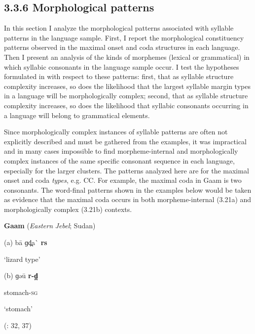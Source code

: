\subsection{3.3.6 Morphological patterns}

  In this section I analyze the morphological patterns associated with syllable patterns in the language sample. First, I report the morphological constituency patterns observed in the maximal onset and coda structures in each language. Then I present an analysis of the kinds of morphemes (lexical or grammatical) in which syllabic consonants in the language sample occur. I test the hypotheses formulated in  with respect to these patterns: first, that as syllable structure complexity increases, so does the likelihood that the largest syllable margin types in a language will be morphologically complex; second, that as syllable structure complexity increases, so does the likelihood that syllabic consonants occurring in a language will belong to grammatical elements.



  Since morphologically complex instances of syllable patterns are often not explicitly described and must be gathered from the examples, it was impractical and in many cases impossible to find morpheme-internal and morphologically complex instances of the same specific consonant sequence in each language, especially for the larger clusters. The patterns analyzed here are for the maximal onset and coda \textit{types}, e.g. CC. For example, the maximal coda in Gaam is two consonants. The word-final patterns shown in the examples below would be taken as evidence that the maximal coda occurs in both morpheme-internal (3.21a) and morphologically complex (3.21b) contexts.



\ea\label{ex:(3.21)}
   \textbf{Gaam} (\textit{Eastern} \textit{Jebel}; Sudan)



(a)  ba\={} ɡd̪a\`{} \textbf{rs}



‘lizard type’



(b)  ɡəu\={} \textbf{r{}-d̪}



stomach-\textsc{sg}



‘stomach’



(\citealt{Stirtz2011}: 32, 37)

